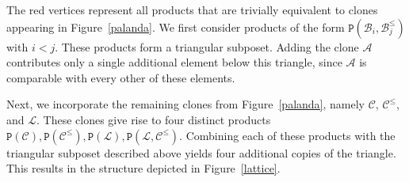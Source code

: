 \documentclass{amsart}
\numberwithin{equation}{section}
\theoremstyle{plain}
\theoremstyle{definition}
\def\clone#1{\mathcal{#1}}
\def\Bc{\clone{B}}
\def\Ac{\clone{A}}
\def\Lc{\clone{L}}
\def\Cc{\clone{C}}
\def\C#1{{\mathtt{P}}(#1)}
\begin{document}
The red vertices represent all products that are trivially equivalent to clones appearing in Figure~\ref{palanda}. We first consider products of the form $\C{\Bc_i,\Bc_j^{\leq}}$ with $i<j$. These products form a triangular subposet. Adding the clone $\Ac$ contributes only a single additional element below this triangle, since $\Ac$ is comparable with every other of these elements. 

Next, we incorporate the remaining clones from Figure~\ref{palanda}, namely $\Cc$, $\Cc^{\leq}$, and $\Lc$. These clones give rise to four distinct products  $\C{\Cc}, \C{\Cc^{\leq}}, \C{\Lc}, \C{\Lc,\Cc^{\leq}}.$ Combining each of these products with the triangular subposet described above yields four additional copies of the triangle. This results in the structure depicted in Figure~\ref{lattice}.
\end{document}
